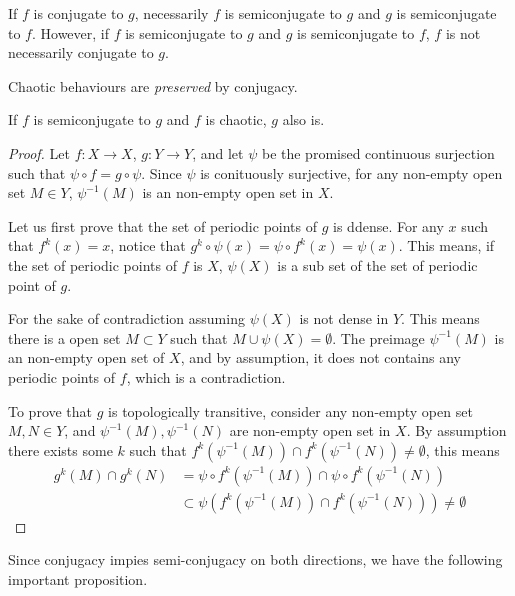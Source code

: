 If $f$ is conjugate to $g$, necessarily $f$ is semiconjugate to $g$ and $g$ is semiconjugate to $f$. 
However, if $f$ is semiconjugate to $g$ and $g$ is semiconjugate to $f$, $f$ is not necessarily conjugate to $g$. 

Chaotic behaviours are \emph{preserved} by conjugacy.


\begin{thm}\label{th_semicong_chaos}
	If $f$ is semiconjugate to $g$ and $f$ is chaotic, $g$ also is.
\end{thm}

\begin{proof}
	Let $f: X \rightarrow X$, $g:  Y \rightarrow Y$, and let $\psi$ be the promised continuous surjection such that
	$\psi \circ f = g \circ \psi$. 
	Since $\psi$ is conituously surjective, for any non-empty open set $M \in Y$, $\psi^{-1}(M)$ is an non-empty open set in $X$.

	Let us first prove that the set of periodic points of $g$ is ddense.
	For any $x$ such that $f^k(x) = x$, notice that $g^k \circ \psi (x) = \psi \circ f^k (x) = \psi(x)$. 
	This means, if the set of periodic points of $f$ is $X$, $\psi(X)$ is a sub set of the set of periodic point of $g$.

	For the sake of contradiction assuming $\psi(X)$ is not dense in $Y$. 
	This means there is a open set $M \subset Y$ such that $M \cup \psi(X) = \emptyset$.
	The preimage $\psi^{-1}(M)$ is an non-empty open set of $X$, and by assumption, it does not contains any periodic points of $f$, which is a contradiction.

	To prove that $g$ is topologically transitive, consider any non-empty open set $M, N \in Y$, and $\psi^{-1}(M), \psi^{-1}(N)$ are non-empty open set in $X$. 
	By assumption there exists some $k$ such that $f^k(\psi^{-1}(M)) \cap f^k(\psi^{-1}(N)) \neq \emptyset$, this means 
	\begin{align*}
		g^k(M) \cap g^k(N) 
		&= \psi \circ f^k(\psi^{-1}(M)) \cap \psi \circ f^k(\psi^{-1}(N)) \\
	    &\subset \psi( f^k(\psi^{-1}(M)) \cap  f^k(\psi^{-1}(N))) \neq \emptyset
	\end{align*}
\end{proof}

Since conjugacy impies semi-conjugacy on both directions, we have the following important proposition.

